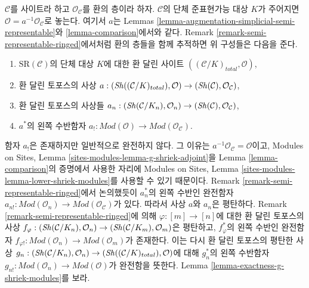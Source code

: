 \begin{remark}[환 달린 변형]
\label{remark-augmentation-ringed}
$\mathcal{C}$를 사이트라 하고 $\mathcal{O}_\mathcal{C}$를
환의 층이라 하자. $\mathcal{C}$의 단체 준표현가능 대상 $K$가 주어지면
$\mathcal{O} = a^{-1}\mathcal{O}_\mathcal{C}$로 놓는다. 여기서 $a$는
Lemmas \ref{lemma-augmentation-simplicial-semi-representable}와
\ref{lemma-comparison}에서와 같다.
Remark \ref{remark-semi-representable-ringed}에서처럼 환의 층들을
함께 추적하면 위 구성들은 다음을 준다.
\begin{enumerate}
\item $\text{SR}(\mathcal{C})$의 단체 대상 $K$에 대한 환 달린 사이트
$((\mathcal{C}/K)_{total}, \mathcal{O})$,
\item 환 달린 토포스의 사상
$a : (\mathop{\mathit{Sh}}\nolimits((\mathcal{C}/K)_{total}), \mathcal{O}) \to
(\mathop{\mathit{Sh}}\nolimits(\mathcal{C}), \mathcal{O}_\mathcal{C})$,
\item 환 달린 토포스의 사상들
$a_n : (\mathop{\mathit{Sh}}\nolimits(\mathcal{C}/K_n), \mathcal{O}_n) \to
(\mathop{\mathit{Sh}}\nolimits(\mathcal{C}), \mathcal{O}_\mathcal{C})$,
\item $a^*$의 왼쪽 수반함자
$a_! : \textit{Mod}(\mathcal{O}) \to \textit{Mod}(\mathcal{O}_\mathcal{C})$.
\end{enumerate}
함자 $a_!$은 존재하지만 일반적으로 완전하지 않다. 그 이유는
$a^{-1}\mathcal{O}_\mathcal{C} = \mathcal{O}$이고,
Modules on Sites, Lemma \ref{sites-modules-lemma-g-shriek-adjoint}을
Lemma \ref{lemma-comparison}의 증명에서 사용한 자리에 Modules on Sites, Lemma
\ref{sites-modules-lemma-lower-shriek-modules}를 사용할 수 있기 때문이다.
Remark \ref{remark-semi-representable-ringed}에서 논의했듯이
$a_n^*$의 왼쪽 수반인 완전함자
$a_{n!} : \textit{Mod}(\mathcal{O}_n) \to
\textit{Mod}(\mathcal{O}_\mathcal{C})$가 있다.
따라서 사상 $a$와 $a_n$은 평탄하다.
Remark \ref{remark-semi-representable-ringed}에 의해
$\varphi : [m] \to [n]$에 대한 환 달린 토포스의 사상
$f_\varphi : (\mathop{\mathit{Sh}}\nolimits(\mathcal{C}/K_n), \mathcal{O}_n) \to
(\mathop{\mathit{Sh}}\nolimits(\mathcal{C}/K_m), \mathcal{O}_m)$은 평탄하고,
$f_\varphi^*$의 왼쪽 수반인 완전함자
$f_{\varphi !} : \textit{Mod}(\mathcal{O}_n) \to
\textit{Mod}(\mathcal{O}_m)$가 존재한다.
이는 다시 환 달린 토포스의 평탄한 사상
$g_n : (\mathop{\mathit{Sh}}\nolimits(\mathcal{C}/K_n), \mathcal{O}_n) \to
(\mathop{\mathit{Sh}}\nolimits((\mathcal{C}/K)_{total}), \mathcal{O})$에 대해
$g_n^*$의 왼쪽 수반함자
$g_{n!} : \textit{Mod}(\mathcal{O}_n) \to
\textit{Mod}(\mathcal{O})$가 완전함을 뜻한다.
Lemma \ref{lemma-exactness-g-shriek-modules}를 보라.
\end{remark}

